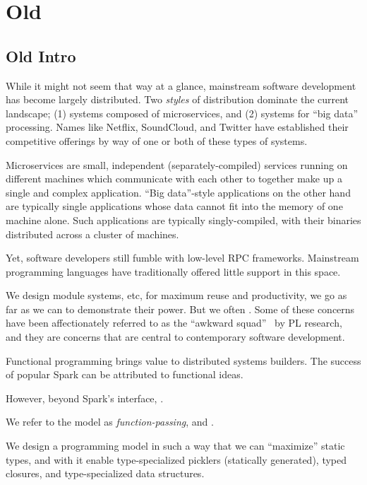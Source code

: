 \documentclass[preprint]{sigplanconf}
\theoremstyle{definition}
\theoremstyle{definition}
\begin{document}
\section{Old}

\subsection{Old Intro}


While it might not seem that way at a glance, mainstream software development
has become largely distributed. Two {\em styles} of distribution
dominate the current landscape; (1) systems composed of microservices,
and (2) systems for ``big data'' processing. Names like Netflix, SoundCloud,
and Twitter have established their competitive offerings by way of one or
both of these types of systems.

Microservices are small, independent (separately-compiled) services running on
different machines which communicate with each other to together make up a
single and complex application. ``Big data''-style applications on the other
hand are typically single applications whose data cannot fit into the memory
of one machine alone. Such applications are typically singly-compiled, with
their binaries distributed across a cluster of machines.

Yet, software developers still fumble with low-level RPC frameworks.
Mainstream programming languages have traditionally offered little support in
this space.

We design module systems, etc, for maximum reuse and productivity, we go as
far as we can to demonstrate their power. But we often . Some of these
concerns have been affectionately referred to as the ``awkward
squad''~\cite{AwkwardSquad} by PL research, and they are concerns that are central to
contemporary software development.

Functional programming brings value to distributed systems builders. The
success of popular Spark can be attributed to functional ideas.

However, beyond Spark's interface, .

We refer to the model as {\em function-passing}, and .


We design a programming model in such a way that we can ``maximize'' static
types, and with it enable type-specialized picklers (statically generated),
typed closures, and type-specialized data structures.
\end{document}
